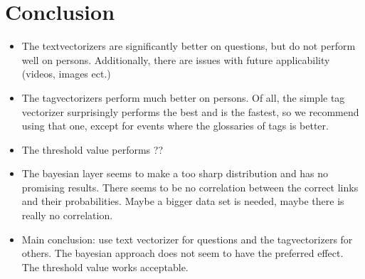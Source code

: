 \section{Conclusion}
\begin{itemize}
\item The textvectorizers are significantly better on questions, but do not perform well on persons. Additionally, there are issues with future applicability (videos, images ect.)
\item The tagvectorizers perform much better on persons. Of all, the simple tag vectorizer surprisingly performs the best and is the fastest, so we recommend using that one, except for events where the glossaries of tags is better. 
\item The threshold value performs ??
\item The bayesian layer seems to make a too sharp distribution and has no promising results. There seems to be no correlation between the correct links and their probabilities. Maybe a bigger data set is needed, maybe there is really no correlation. 
\item Main conclusion: use text vectorizer for questions and the tagvectorizers for others. The bayesian approach does not seem to have the preferred effect. The threshold value works acceptable. 
\end{itemize}